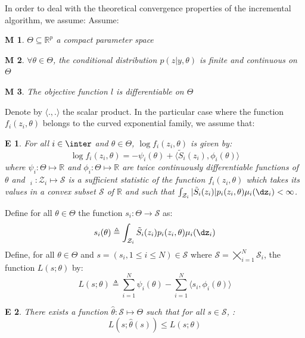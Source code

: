 \documentclass[a4paper]{article}
\theoremstyle{plain}
\newtheorem{assumption}{M}
\newtheorem{assumption_expo}{E}
\DeclareMathOperator*{\St}{\tilde{S}}
\theoremstyle{plain}
\theoremstyle{definition}
\begin{document}
In order to deal with the theoretical convergence properties of the incremental algorithm, we assume:
Assume:

\begin{assumption}
$\Theta \subseteq \mathbb{R}^p$ a compact parameter space
\end{assumption}


\begin{assumption}
$\forall \theta \in \Theta$, the conditional distribution $p(z|y,\theta)$ is finite and continuous on $\Theta$
\end{assumption}

\begin{assumption}
The objective function  $l$ is differentiable on $\Theta$
\end{assumption}

Denote by $\langle . { , }. \rangle$ the scalar product. In the particular case where the function $f_i(z_i,\theta)$ belongs to the curved exponential family, we assume that:
\begin{assumption_expo}
For all $i \in \inter$ and $\theta \in \Theta$, $\log f_i(z_i,\theta) $ is given by:
\begin{equation}
\log f_i(z_i,\theta) = -\psi_i(\theta) + \langle \tilde{S}_i(z_i), \phi_i(\theta)\rangle
\end{equation}
where $\psi_i: \Theta \mapsto \mathbb{R}$ and $\phi_i: \Theta \mapsto \mathbb{R}$ are twice continuously differentiable functions of $\theta$ and $\St_i: \mathcal{Z}_i \mapsto \mathcal{S}$ is a sufficient statistic of the function $f_i(z_i,\theta)$  which takes its values in a convex subset $\mathcal{S}$ of $\mathbb{R}$ and such that $\int_{\mathcal{Z}_i}{|\tilde{S}_i(z_i)|p_i(z_i,\theta) \mu_i(\dz_i)} < \infty$. 
\end{assumption_expo}
Define for all $\theta \in \Theta$ the function $s_i: \Theta \to \mathcal{S}$ as:
\begin{equation}
s_i(\theta) \triangleq \int_{\mathcal{Z}_i}{\tilde{S}_i(z_i)p_i(z_i,\theta) \mu_i(\dz_i)}
\end{equation}
Define, for all $\theta \in \Theta$ and $s = (s_i, 1 \leq i \leq N) \in \mathcal{S}$ where $\mathcal{S} = \varprod_{i=1}^N\mathcal{S}_i$, the function $L(s; \theta)$ by:
\begin{equation}
L(s;\theta) \triangleq \sum_{i=1}^N{\psi_i(\theta)} - \sum_{i=1}^N{\langle s_i, \phi_i(\theta)\rangle}
\end{equation}
\begin{assumption_expo}
There exists a function $\hat{\theta}: \mathcal{S} \mapsto \Theta$ such that for all $s \in \mathcal{S}$, :
\begin{equation}\label{max_suff}
L(s;\hat{\theta}(s))\leq L(s;\theta)
\end{equation}
\end{assumption_expo}
\end{document}
